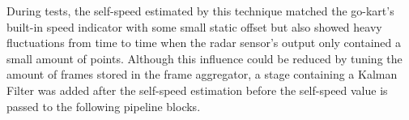 \FloatBarrier\noindent
During tests, the self-speed estimated by this technique matched the go-kart's built-in speed indicator with some small static offset but also showed heavy fluctuations from time to time when the radar sensor's output only contained a small amount of points.
Although this influence could be reduced by tuning the amount of frames stored in the frame aggregator, a stage containing a Kalman Filter was added after the self-speed estimation before the self-speed value is passed to the following pipeline blocks.

